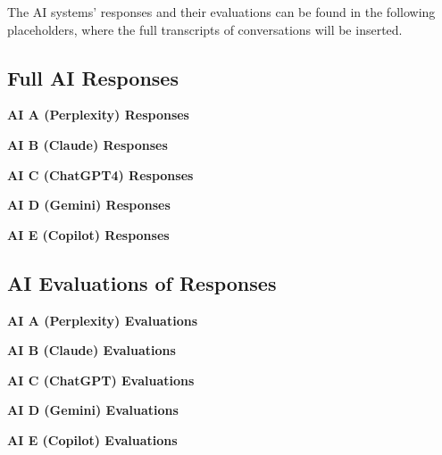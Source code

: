 \documentclass[12pt]{article}
\begin{document}
The AI systems' responses and their evaluations can be found in the following placeholders, where the full transcripts of conversations will be inserted.

\subsection{Full AI Responses}

\textbf{AI A (Perplexity) Responses} \\


\vspace{1cm}

\textbf{AI B (Claude) Responses} \\


\vspace{1cm}

\textbf{AI C (ChatGPT4) Responses} \\


\vspace{1cm}

\textbf{AI D (Gemini) Responses} \\


\vspace{1cm}

\textbf{AI E (Copilot) Responses} \\


\subsection{AI Evaluations of Responses}

\textbf{AI A (Perplexity) Evaluations} \\


\vspace{1cm}

\textbf{AI B (Claude) Evaluations} \\


\vspace{1cm}

\textbf{AI C (ChatGPT) Evaluations} \\


\vspace{1cm}

\textbf{AI D (Gemini) Evaluations} \\


\vspace{1cm}

\textbf{AI E (Copilot) Evaluations} \\

\end{document}
